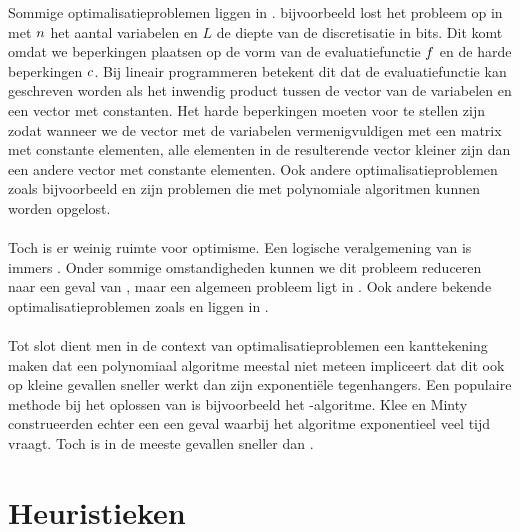 Sommige optimalisatieproblemen liggen in . \cite{linearProgrammingInP} bijvoorbeeld lost het  probleem op in  met $n$ het aantal variabelen en $L$ de diepte van de discretisatie in bits. Dit komt omdat we beperkingen plaatsen op de vorm van de evaluatiefunctie $f$ en de harde beperkingen $c$. Bij lineair programmeren betekent dit dat de evaluatiefunctie kan geschreven worden als het inwendig product tussen de vector van de variabelen en een vector met constanten. Het harde beperkingen moeten voor te stellen zijn zodat wanneer we de vector met de variabelen vermenigvuldigen met een matrix met constante elementen, alle elementen in de resulterende vector kleiner zijn dan een andere vector met constante elementen. Ook andere optimalisatieproblemen zoals bijvoorbeeld  en  zijn problemen die met polynomiale algoritmen kunnen worden opgelost.

\paragraph{}
Toch is er weinig ruimte voor optimisme. Een logische veralgemening van  is immers . Onder sommige omstandigheden kunnen we dit probleem reduceren naar een geval van \cite{Kozlov1980223}, maar een algemeen  probleem ligt in \cite{qpInNP}. Ook andere bekende optimalisatieproblemen zoals  en  liggen in .

\paragraph{}
Tot slot dient men in de context van optimalisatieproblemen een kanttekening maken dat een polynomiaal algoritme meestal niet meteen impliceert dat dit ook op kleine gevallen sneller werkt dan zijn exponenti\"ele tegenhangers. Een populaire methode bij het oplossen van  is bijvoorbeeld het -algoritme. Klee en Minty\cite{klee:1972} construeerden echter een een geval waarbij het algoritme exponentieel veel tijd vraagt. Toch is  in de meeste gevallen sneller dan .

\section{Heuristieken}

